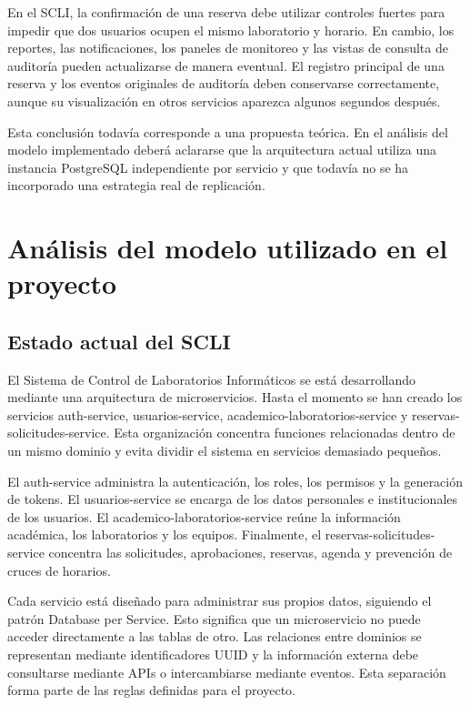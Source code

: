 \documentclass[conference]{IEEEtran}
\begin{document}
En el SCLI, la confirmación de una reserva debe utilizar controles fuertes para impedir que dos usuarios ocupen el mismo laboratorio y horario. En cambio, los reportes, las notificaciones, los paneles de monitoreo y las vistas de consulta de auditoría pueden actualizarse de manera eventual. El registro principal de una reserva y los eventos originales de auditoría deben conservarse correctamente, aunque su visualización en otros servicios aparezca algunos segundos después.

Esta conclusión todavía corresponde a una propuesta teórica. En el análisis del modelo implementado deberá aclararse que la arquitectura actual utiliza una instancia PostgreSQL independiente por servicio y que todavía no se ha incorporado una estrategia real de replicación.

\section{Análisis del modelo utilizado en el proyecto}

\subsection{Estado actual del SCLI}
El Sistema de Control de Laboratorios Informáticos se está desarrollando mediante una arquitectura de microservicios. Hasta el momento se han creado los servicios auth-service, usuarios-service, academico-laboratorios-service y reservas-solicitudes-service. Esta organización concentra funciones relacionadas dentro de un mismo dominio y evita dividir el sistema en servicios demasiado pequeños.

El auth-service administra la autenticación, los roles, los permisos y la generación de tokens. El usuarios-service se encarga de los datos personales e institucionales de los usuarios. El academico-laboratorios-service reúne la información académica, los laboratorios y los equipos. Finalmente, el reservas-solicitudes-service concentra las solicitudes, aprobaciones, reservas, agenda y prevención de cruces de horarios.

Cada servicio está diseñado para administrar sus propios datos, siguiendo el patrón Database per Service. Esto significa que un microservicio no puede acceder directamente a las tablas de otro. Las relaciones entre dominios se representan mediante identificadores UUID y la información externa debe consultarse mediante APIs o intercambiarse mediante eventos. Esta separación forma parte de las reglas definidas para el proyecto.
\end{document}
